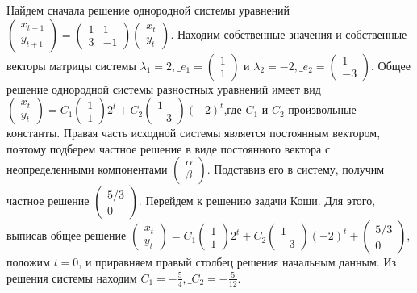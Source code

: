 \begin{solution}
Найдем сначала решение однородной системы уравнений $\left(\begin{array}{c} {x_{t+1} } \\ {y_{t+1} } \end{array}\right)=\left(\begin{array}{cc} {1} & {1} \\ {3} & {-1} \end{array}\right)\left(\begin{array}{c} {x_{t} } \\ {y_{t} } \end{array}\right)$. Находим собственные значения и собственные векторы матрицы системы $\lambda _{1} =2,\_ e_{1} =\left(\begin{array}{c} {1} \\ {1} \end{array}\right)$ и $\lambda _{2} =-2,\_ e_{2} =\left(\begin{array}{c} {1} \\ {-3} \end{array}\right)$. Общее решение однородной системы разностных уравнений имеет вид $\left(\begin{array}{c} {x_{t} } \\ {y_{t} } \end{array}\right)=C_{1} \left(\begin{array}{c} {1} \\ {1} \end{array}\right)2^{t} +C_{2} \left(\begin{array}{c} {1} \\ {-3} \end{array}\right)(-2)^{t} $,где $C_{1} $ и $C_{2} $ произвольные константы. Правая часть исходной системы является постоянным вектором, поэтому подберем частное решение в виде постоянного вектора с неопределенными компонентами $\left(\begin{array}{c} {\alpha } \\ {\beta } \end{array}\right)$. Подставив его в систему, получим частное решение $\left(\begin{array}{c} {5/3} \\ {0} \end{array}\right)$. Перейдем к решению задачи Коши. Для этого, выписав общее решение $\left(\begin{array}{c} {x_{t} } \\ {y_{t} } \end{array}\right)=C_{1} \left(\begin{array}{c} {1} \\ {1} \end{array}\right)2^{t} +C_{2} \left(\begin{array}{c} {1} \\ {-3} \end{array}\right)(-2)^{t} +\left(\begin{array}{c} {5/3} \\ {0} \end{array}\right)$, положим $t=0$, и приравняем правый столбец решения начальным данным. Из решения системы находим $C_{1} =-\frac{5}{4} ,\_ C_{2} =-\frac{5}{12} $.

\end{solution}
